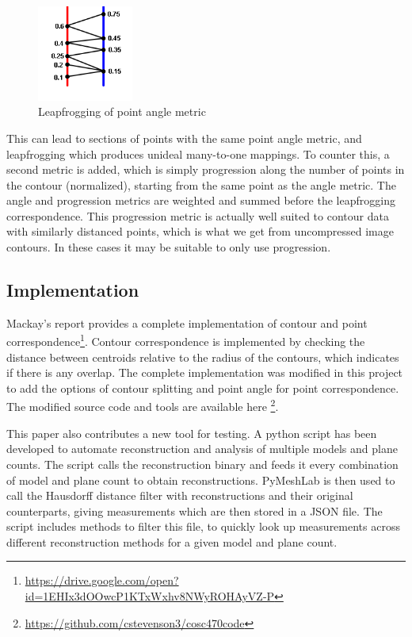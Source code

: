 \documentclass[11p, titlepage]{article}
\begin{document}
\begin{figure}
\centering
\includegraphics[width=0.28\textwidth]{diagrams/point_angle_leapfrogging}
\caption{Leapfrogging of point angle metric \label{fig:point_angle_leapfrogging}}
\end{figure}

This can lead to sections of points with the same point angle metric, and leapfrogging which produces unideal many-to-one mappings. To counter this, a second metric is added, which is simply progression along the number of points in the contour (normalized), starting from the same point as the angle metric. The angle and progression metrics are weighted and summed before the leapfrogging correspondence. This progression metric is actually well suited to contour data with similarly distanced points, which is what we get from uncompressed image contours. In these cases it may be suitable to only use progression.

\subsection{Implementation}

Mackay's report provides a complete implementation of contour and point correspondence\footnote{\url{https://drive.google.com/open?id=1EHIx3dOOwcP1KTxWxhv8NWyROHAyVZ-P}}. Contour correspondence is implemented by checking the distance between centroids relative to the radius of the contours, which indicates if there is any overlap. The complete implementation was modified in this project to add the options of contour splitting and point angle for point correspondence. The modified source code and tools are available here \footnote{\url{https://github.com/cstevenson3/cosc470code}}.

This paper also contributes a new tool for testing. A python script has been developed to automate reconstruction and analysis of multiple models and plane counts. The script calls the reconstruction binary and feeds it every combination of model and plane count to obtain reconstructions. PyMeshLab \cite{pymeshlab} is then used to call the Hausdorff distance filter with reconstructions and their original counterparts, giving measurements which are then stored in a JSON file. The script includes methods to filter this file, to quickly look up measurements across different reconstruction methods for a given model and plane count.
\pagebreak
\end{document}
